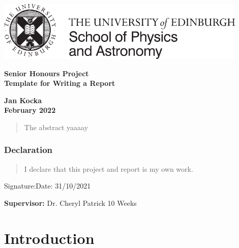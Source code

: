 \documentclass[a4paper,12pt]{article}
\begin{document}
\pagestyle{empty}
\par\noindent\includegraphics[width=12cm]{PandA_crest.pdf}
\par\noindent

\vspace*{2cm}

\begin{center}
        \Large\bf \Large\bf Senior Honours Project \\
        \LARGE\bf Template for Writing a Report
\end{center}

\vspace*{0.5cm}

\begin{center}
        \bf Jan Kocka \\
        February 2022
\end{center}
\vspace*{5mm}

\begin{abstract}
    The abstract yaaaay
\end{abstract}

\vspace*{1cm}

\subsubsection*{Declaration}

\begin{quotation}
  I declare that this project and report is my own work.
\end{quotation}

\vspace*{2cm}
Signature:\hspace*{8cm}Date:  31/10/2021

\vfill
{\bf Supervisor:} Dr. Cheryl Patrick
\hfill
10 Weeks
\newpage

\pagestyle{plain}
\setcounter{page}{1}

\tableofcontents

\newpage

\section{Introduction}
\end{document}
